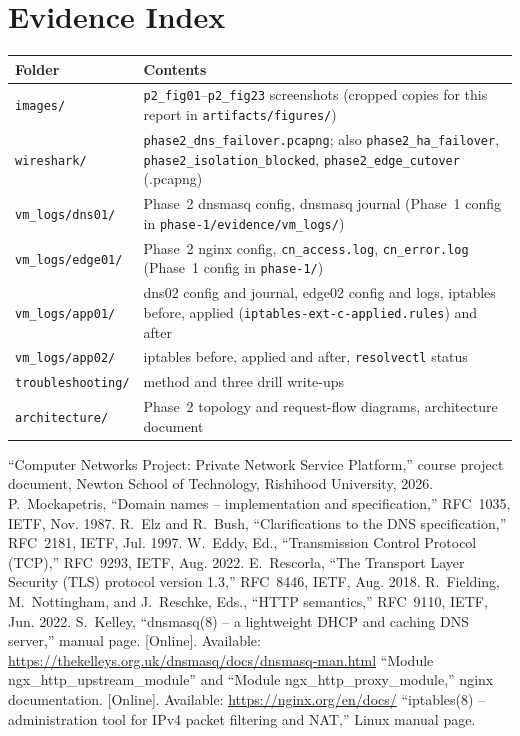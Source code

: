 \documentclass[conference,a4paper]{IEEEtran}
\newcommand{\cmd}[1]{\texttt{\small #1}}
\begin{document}
\appendices
\section{Evidence Index}
\begin{table}[!h]
\centering\footnotesize
\begin{tabularx}{\columnwidth}{@{}l Y@{}}
\toprule
Folder & Contents\\
\midrule
\cmd{images/} & \cmd{p2\_fig01}--\cmd{p2\_fig23} screenshots (cropped copies for this report in \cmd{artifacts/figures/})\\
\cmd{wireshark/} & \cmd{phase2\_dns\_failover.pcapng}; also \cmd{phase2\_ha\_failover}, \cmd{phase2\_isolation\_blocked}, \cmd{phase2\_edge\_cutover} (.pcapng)\\
\cmd{vm\_logs/dns01/} & Phase~2 dnsmasq config, dnsmasq journal (Phase~1 config in \cmd{phase-1/evidence/vm\_logs/})\\
\cmd{vm\_logs/edge01/} & Phase~2 nginx config, \cmd{cn\_access.log}, \cmd{cn\_error.log} (Phase~1 config in \cmd{phase-1/})\\
\cmd{vm\_logs/app01/} & dns02 config and journal, edge02 config and logs, iptables before, applied (\cmd{iptables-ext-c-applied.rules}) and after\\
\cmd{vm\_logs/app02/} & iptables before, applied and after, \cmd{resolvectl} status\\
\cmd{troubleshooting/} & method and three drill write-ups\\
\cmd{architecture/} & Phase~2 topology and request-flow diagrams, architecture document\\
\bottomrule
\end{tabularx}
\end{table}

\begin{thebibliography}{9}
 ``Computer Networks Project: Private Network Service Platform,'' course project document, Newton School of Technology, Rishihood University, 2026.
 P.~Mockapetris, ``Domain names -- implementation and specification,'' RFC~1035, IETF, Nov. 1987.
 R.~Elz and R.~Bush, ``Clarifications to the DNS specification,'' RFC~2181, IETF, Jul. 1997.
 W.~Eddy, Ed., ``Transmission Control Protocol (TCP),'' RFC~9293, IETF, Aug. 2022.
 E.~Rescorla, ``The Transport Layer Security (TLS) protocol version 1.3,'' RFC~8446, IETF, Aug. 2018.
 R.~Fielding, M.~Nottingham, and J.~Reschke, Eds., ``HTTP semantics,'' RFC~9110, IETF, Jun. 2022.
 S.~Kelley, ``dnsmasq(8) -- a lightweight DHCP and caching DNS server,'' manual page. [Online]. Available: \url{https://thekelleys.org.uk/dnsmasq/docs/dnsmasq-man.html}
 ``Module ngx\_http\_upstream\_module'' and ``Module ngx\_http\_proxy\_module,'' nginx documentation. [Online]. Available: \url{https://nginx.org/en/docs/}
 ``iptables(8) -- administration tool for IPv4 packet filtering and NAT,'' Linux manual page.
\end{thebibliography}
\end{document}
